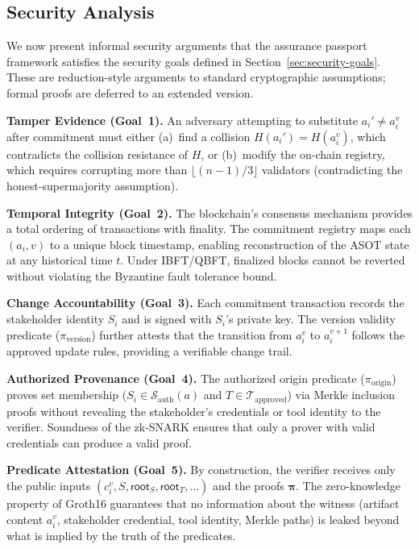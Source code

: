 \subsection{Security Analysis}
\label{sec:fw-security}

We now present informal security arguments that the assurance passport framework satisfies the security goals defined in Section~\ref{sec:security-goals}.
These are reduction-style arguments to standard cryptographic assumptions; formal proofs are deferred to an extended version.

\textbf{Tamper Evidence (Goal~1).}
An adversary attempting to substitute $a_i' \neq a_i^{v}$ after commitment must either (a)~find a collision $H(a_i') = H(a_i^{v})$, which contradicts the collision resistance of $H$, or (b)~modify the on-chain registry, which requires corrupting more than $\lfloor (n-1)/3 \rfloor$ validators (contradicting the honest-supermajority assumption).

\textbf{Temporal Integrity (Goal~2).}
The blockchain's consensus mechanism provides a total ordering of transactions with finality.
The commitment registry maps each $(a_i, v)$ to a unique block timestamp, enabling reconstruction of the ASOT state at any historical time $t$.
Under IBFT/QBFT, finalized blocks cannot be reverted without violating the Byzantine fault tolerance bound.

\textbf{Change Accountability (Goal~3).}
Each commitment transaction records the stakeholder identity $S_i$ and is signed with $S_i$'s private key.
The version validity predicate ($\pi_{\text{version}}$) further attests that the transition from $a_i^{v}$ to $a_i^{v+1}$ follows the approved update rules, providing a verifiable change trail.

\textbf{Authorized Provenance (Goal~4).}
The authorized origin predicate ($\pi_{\text{origin}}$) proves set membership ($S_i \in \mathcal{S}_{\text{auth}}(a)$ and $T \in \mathcal{T}_{\text{approved}}$) via Merkle inclusion proofs without revealing the stakeholder's credentials or tool identity to the verifier.
Soundness of the zk-SNARK ensures that only a prover with valid credentials can produce a valid proof.

\textbf{Predicate Attestation (Goal~5).}
By construction, the verifier receives only the public inputs $(c_i^{v}, S, \mathsf{root}_S, \mathsf{root}_T, \ldots)$ and the proofs $\boldsymbol{\pi}$.
The zero-knowledge property of Groth16 guarantees that no information about the witness (artifact content $a_i^{v}$, stakeholder credential, tool identity, Merkle paths) is leaked beyond what is implied by the truth of the predicates.

